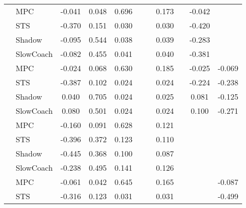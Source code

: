 \begin{tabular}{|l|l|*{9}{c|}}
\midrule
[True, True, True, False, False, True, False, True, False] & MPC &   -0.041 &     0.048 &     0.696 &     &     &  0.173 &      &  -0.042 &       \\
                                                           & STS &   -0.370 &     0.151 &     0.030 &     &     &  0.030 &      &  -0.420 &       \\
                                                           & Shadow &   -0.095 &     0.544 &     0.038 &     &     &  0.039 &      &  -0.283 &       \\
                                                           & SlowCoach &   -0.082 &     0.455 &     0.041 &     &     &  0.040 &      &  -0.381 &       \\
\midrule
[True, True, True, False, False, True, False, True, True] & MPC &   -0.024 &     0.068 &     0.630 &     &     &  0.185 &      &  -0.025 &   -0.069 \\
                                                           & STS &   -0.387 &     0.102 &     0.024 &     &     &  0.024 &      &  -0.224 &   -0.238 \\
                                                           & Shadow &    0.040 &     0.705 &     0.024 &     &     &  0.025 &      &   0.081 &   -0.125 \\
                                                           & SlowCoach &    0.080 &     0.501 &     0.024 &     &     &  0.024 &      &   0.100 &   -0.271 \\
\midrule
[True, True, True, False, False, True, False, False, False] & MPC &   -0.160 &     0.091 &     0.628 &     &     &  0.121 &      &      &       \\
                                                           & STS &   -0.396 &     0.372 &     0.123 &     &     &  0.110 &      &      &       \\
                                                           & Shadow &   -0.445 &     0.368 &     0.100 &     &     &  0.087 &      &      &       \\
                                                           & SlowCoach &   -0.238 &     0.495 &     0.141 &     &     &  0.126 &      &      &       \\
\midrule
[True, True, True, False, False, True, False, False, True] & MPC &   -0.061 &     0.042 &     0.645 &     &     &  0.165 &      &      &   -0.087 \\
                                                           & STS &   -0.316 &     0.123 &     0.031 &     &     &  0.031 &      &      &   -0.499 \\

\end{tabular}
